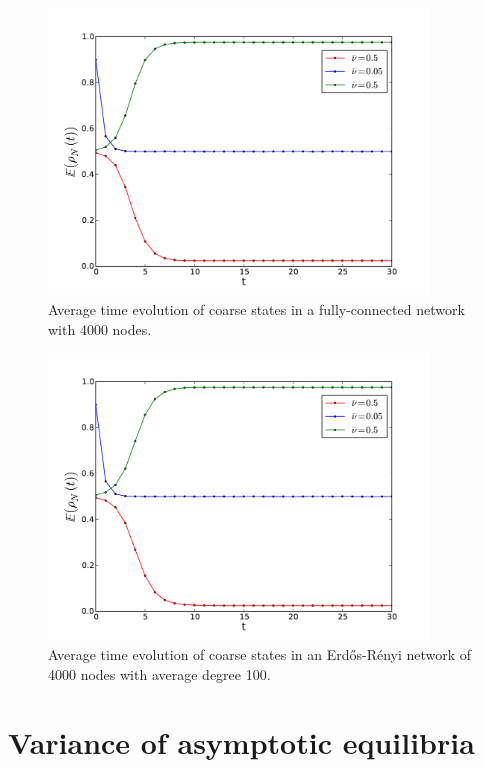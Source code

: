 \documentclass[]{article}
\begin{document}
\begin{figure}


\includegraphics[width=0.9\textwidth]{time_evolution_fully_M1000_N4000.pdf}
\caption{Average time evolution of coarse states in a fully-connected network with 4000 nodes.}
\label{fig:time_evolution}
\end{figure}


\begin{figure}
\includegraphics[width=0.9\textwidth]{time_evolution_random_M1000_N4000.pdf}
\caption{Average time evolution of coarse states in an Erd\H{o}s-Rényi network of 4000 nodes with average degree 100.}
\label{fig:time_evolution_erdos}
\end{figure}


\section{Variance of asymptotic equilibria}
\end{document}
